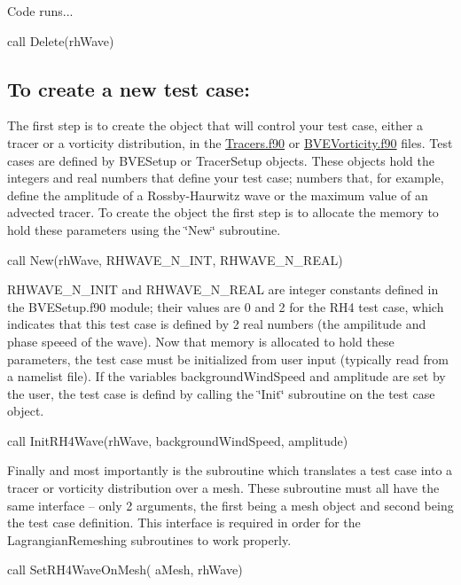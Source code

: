 Code runs... \begin{DoxyVerb}call Delete(rhWave) 
\end{DoxyVerb}


\subsection*{To create a new test case\+: }

The first step is to create the object that will control your test case, either a tracer or a vorticity distribution, in the \hyperlink{_tracers_8f90}{Tracers.\+f90} or \hyperlink{_b_v_e_vorticity_8f90}{B\+V\+E\+Vorticity.\+f90} files. Test cases are defined by B\+V\+E\+Setup or Tracer\+Setup objects. These objects hold the integers and real numbers that define your test case; numbers that, for example, define the amplitude of a Rossby-\/\+Haurwitz wave or the maximum value of an advected tracer. To create the object the first step is to allocate the memory to hold these parameters using the \char`\"{}\+New\char`\"{} subroutine. \begin{DoxyVerb}call New(rhWave, RHWAVE_N_INT, RHWAVE_N_REAL)
\end{DoxyVerb}


R\+H\+W\+A\+V\+E\+\_\+\+N\+\_\+\+I\+N\+I\+T and R\+H\+W\+A\+V\+E\+\_\+\+N\+\_\+\+R\+E\+A\+L are integer constants defined in the B\+V\+E\+Setup.\+f90 module; their values are 0 and 2 for the R\+H4 test case, which indicates that this test case is defined by 2 real numbers (the ampilitude and phase speeed of the wave). Now that memory is allocated to hold these parameters, the test case must be initialized from user input (typically read from a namelist file). If the variables background\+Wind\+Speed and amplitude are set by the user, the test case is defind by calling the \char`\"{}\+Init\char`\"{} subroutine on the test case object. \begin{DoxyVerb}call InitRH4Wave(rhWave, backgroundWindSpeed, amplitude)
\end{DoxyVerb}


Finally and most importantly is the subroutine which translates a test case into a tracer or vorticity distribution over a mesh. These subroutine must all have the same interface -- only 2 arguments, the first being a mesh object and second being the test case definition. This interface is required in order for the Lagrangian\+Remeshing subroutines to work properly. \begin{DoxyVerb}call SetRH4WaveOnMesh( aMesh, rhWave)
\end{DoxyVerb}


